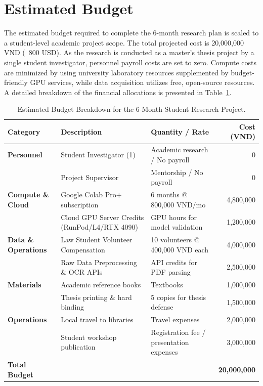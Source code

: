 \section{Estimated Budget}

The estimated budget required to complete the 6-month research plan is scaled to a student-level academic project scope. The total projected cost is 20,000,000 VND (~$800$ USD). As the research is conducted as a master's thesis project by a single student investigator, personnel payroll costs are set to zero. Compute costs are minimized by using university laboratory resources supplemented by budget-friendly GPU services, while data acquisition utilizes free, open-source resources. A detailed breakdown of the financial allocations is presented in Table~\ref{tab:estimated_budget}.

\begin{table}[p]
\small
\centering
\caption{Estimated Budget Breakdown for the 6-Month Student Research Project.}
\label{tab:estimated_budget}
\begin{tabularx}{\textwidth}{lXXr}
\hline
\textbf{Category} & \textbf{Description} & \textbf{Quantity / Rate} & \textbf{Cost (VND)} \\
\hline
\textbf{Personnel} & Student Investigator (1) & Academic research / No payroll & 0 \\
                   & Project Supervisor & Mentorship / No payroll & 0 \\
\hline
\textbf{Compute \& Cloud} & Google Colab Pro+ subscription & 6 months @ 800,000 VND/mo & 4,800,000 \\
                          & Cloud GPU Server Credits (RunPod/L4/RTX 4090) & GPU hours for model validation & 1,200,000 \\
\hline
\textbf{Data \& Operations} & Law Student Volunteer Compensation & 10 volunteers @ 400,000 VND each & 4,000,000 \\
                            & Raw Data Preprocessing \& OCR APIs & API credits for PDF parsing & 2,500,000 \\
\hline
\textbf{Materials} & Academic reference books & Textbooks & 1,000,000 \\
                   & Thesis printing \& hard binding & 5 copies for thesis defense & 1,500,000 \\
\hline
\textbf{Operations} & Local travel to libraries & Travel expenses & 2,000,000 \\
                    & Student workshop publication & Registration fee / presentation expenses & 3,000,000 \\
\hline
\textbf{Total Budget} & & & \textbf{20,000,000} \\
\hline
\end{tabularx}
\end{table}

